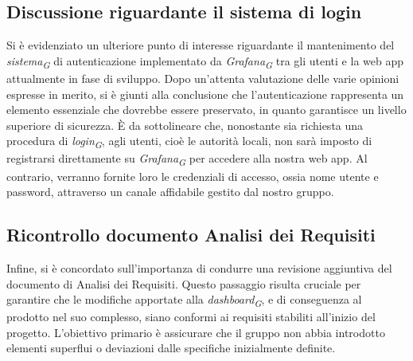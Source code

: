 \documentclass{article}
\begin{document}
    \subsection{Discussione riguardante il sistema di login}
    Si è evidenziato un ulteriore punto di interesse riguardante il mantenimento del \textit{sistema}\textsubscript{\textit{G}} di autenticazione implementato da \textit{Grafana}\textsubscript{\textit{G}} tra gli utenti e la web app attualmente in fase di sviluppo. Dopo un'attenta valutazione delle varie opinioni espresse in merito, si è giunti alla conclusione che l'autenticazione rappresenta un elemento essenziale che dovrebbe essere preservato, in quanto garantisce un livello superiore di sicurezza. È da sottolineare che, nonostante sia richiesta una procedura di \textit{login}\textsubscript{\textit{G}}, agli utenti, cioè le autorità locali, non sarà imposto di registrarsi direttamente su \textit{Grafana}\textsubscript{\textit{G}} per accedere alla nostra web app. Al contrario, verranno fornite loro le credenziali di accesso, ossia nome utente e password, attraverso un canale affidabile gestito dal nostro gruppo.
    \subsection{Ricontrollo documento Analisi dei Requisiti}
    Infine, si è concordato sull'importanza di condurre una revisione aggiuntiva del documento di Analisi dei Requisiti. Questo passaggio risulta cruciale per garantire che le modifiche apportate alla \textit{dashboard}\textsubscript{\textit{G}}, e di conseguenza al prodotto nel suo complesso, siano conformi ai requisiti stabiliti all'inizio del progetto. L'obiettivo primario è assicurare che il gruppo non abbia introdotto elementi superflui o deviazioni dalle specifiche inizialmente definite.
\end{document}
